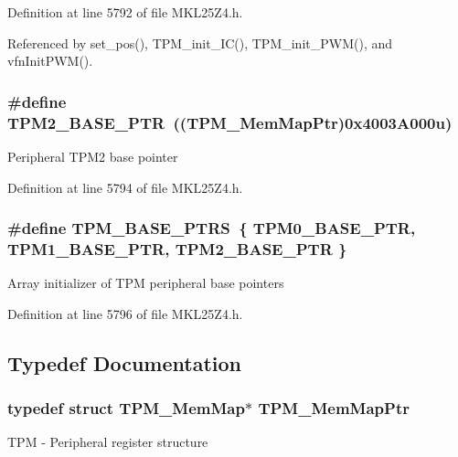 Definition at line 5792 of file M\+K\+L25\+Z4.\+h.



Referenced by set\+\_\+pos(), T\+P\+M\+\_\+init\+\_\+\+I\+C(), T\+P\+M\+\_\+init\+\_\+\+P\+W\+M(), and vfn\+Init\+P\+W\+M().

\subsubsection[{\texorpdfstring{T\+P\+M2\+\_\+\+B\+A\+S\+E\+\_\+\+P\+TR}{TPM2_BASE_PTR}}]{\setlength{\rightskip}{0pt plus 5cm}\#define T\+P\+M2\+\_\+\+B\+A\+S\+E\+\_\+\+P\+TR~(({\bf T\+P\+M\+\_\+\+Mem\+Map\+Ptr})0x4003\+A000u)}\hypertarget{group___t_p_m___peripheral_ga37cc120e7475fb646fe9bc15b57f06bc}{}\label{group___t_p_m___peripheral_ga37cc120e7475fb646fe9bc15b57f06bc}
Peripheral T\+P\+M2 base pointer 

Definition at line 5794 of file M\+K\+L25\+Z4.\+h.

\subsubsection[{\texorpdfstring{T\+P\+M\+\_\+\+B\+A\+S\+E\+\_\+\+P\+T\+RS}{TPM_BASE_PTRS}}]{\setlength{\rightskip}{0pt plus 5cm}\#define T\+P\+M\+\_\+\+B\+A\+S\+E\+\_\+\+P\+T\+RS~\{ {\bf T\+P\+M0\+\_\+\+B\+A\+S\+E\+\_\+\+P\+TR}, {\bf T\+P\+M1\+\_\+\+B\+A\+S\+E\+\_\+\+P\+TR}, {\bf T\+P\+M2\+\_\+\+B\+A\+S\+E\+\_\+\+P\+TR} \}}\hypertarget{group___t_p_m___peripheral_ga1d61ed554c056d8f63d1dbcc7ce05e62}{}\label{group___t_p_m___peripheral_ga1d61ed554c056d8f63d1dbcc7ce05e62}
Array initializer of T\+PM peripheral base pointers 

Definition at line 5796 of file M\+K\+L25\+Z4.\+h.



\subsection{Typedef Documentation}
\subsubsection[{\texorpdfstring{T\+P\+M\+\_\+\+Mem\+Map\+Ptr}{TPM_MemMapPtr}}]{\setlength{\rightskip}{0pt plus 5cm}typedef struct {\bf T\+P\+M\+\_\+\+Mem\+Map}$\ast$ {\bf T\+P\+M\+\_\+\+Mem\+Map\+Ptr}}\hypertarget{group___t_p_m___peripheral_ga32147338cedc9904efff0d19b3a358ac}{}\label{group___t_p_m___peripheral_ga32147338cedc9904efff0d19b3a358ac}
T\+PM -\/ Peripheral register structure 